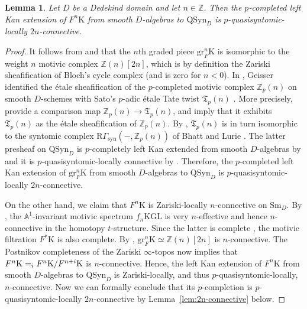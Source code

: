 \documentclass{amsart}
\numberwithin{equation}{section}
\theoremstyle{plain}
\newtheorem{lemma}[equation]{Lemma}
\theoremstyle{definition}
\let\bb=\mathbb
\def\Z{\bb Z}
\def\A{\bb A}
\def\ph{\mathord-}
\let\cat=\mathrm
\def\KGL{\mathrm{KGL}}
\def\K{\mathrm{K}{}}
\def\Sm{{\cat{S}\mathrm{m}}}
\def\gr{\mathrm{gr}}
\newcommand{\QSyn}{\mathrm{QSyn}}
\newcommand{\syn}{\mathrm{syn}}
\let\lim=\relax
\DeclareMathOperator*{\lim}{lim}
\begin{document}
\begin{lemma}\label{lem:motfil}
Let $D$ be a Dedekind domain and let $n\in\Z$.
Then the $p$-completed left Kan extension of $F^n\K$ from smooth $D$-algebras to $\QSyn_D$ is $p$-quasisyntomic-locally $2n$-connective.
\end{lemma}

\begin{proof}
It follows from \cite[Example 1.3]{Bac22} and \cite[Theorem 7.18 and Corollary 5.22]{SpitzweckHZ} that the $n$th graded piece $\gr_F^n\K$ is isomorphic to the weight $n$ motivic complex $\Z(n)[2n]$, which is by definition the Zariski sheafification of Bloch's cycle complex (and is zero for $n<0$).
In \cite{Gei}, Geisser identified the étale sheafification of the $p$-completed motivic complex $\Z_p(n)$ on smooth $D$-schemes with Sato's $p$-adic étale Tate twist $\mathfrak T_p(n)$ \cite[(1.3.3)]{SatoTwists}. More precisely, \cite[Corollary 4.4 and Theorem 1.3]{Gei} provide a comparison map $\Z_p(n)\to\mathfrak T_p(n)$, and \cite[Theorem 1.2(4) and Theorem 1.3]{Gei} imply that it exhibits $\mathfrak T_p(n)$ as the étale sheafification of $\Z_p(n)$.
By \cite[Theorem~5.8]{BM}, $\mathfrak T_p(n)$ is in turn isomorphic to the syntomic complex $\mathrm{R}\Gamma_\syn(\ph,\Z_p(n))$ of Bhatt and Lurie \cite[Section~8.4]{BhattLurie}.
The latter presheaf on $\QSyn_D$ is $p$-completely left Kan extended from smooth $D$-algebras by \cite[Proposition~8.4.10]{BhattLurie} and it is $p$-quasisyntomic-locally connective by \cite[Theorem~14.1]{BS:2022}.
Therefore, the $p$-completed left Kan extension of $\gr_F^n\K$ from smooth $D$-algebras to $\QSyn_D$ is $p$-quasisyntomic-locally $2n$-connective.

On the other hand, we claim that $F^n\K$ is Zariski-locally $n$-connective on $\Sm_D$. By \cite[Theorem 1.1(1)]{Bac22}, the $\A^1$-invariant motivic spectrum $f_n\KGL$ is very $n$-effective and hence $n$-connective in the homotopy $t$-structure. Since the latter is complete \cite[Corollary 3.8]{SchmidtStrunk}, the motivic filtration $F^*\K$ is also complete. By \cite[Corollary 4.4]{Gei}, $\gr_F^n\K\simeq \Z(n)[2n]$ is $n$-connective. The Postnikov completeness of the Zariski $\infty$-topos now implies that $F^n\K=\lim_i F^n\K/F^{n+i}\K$ is $n$-connective.
Hence, the left Kan extension of $F^n\K$ from smooth $D$-algebras to $\QSyn_D$ is Zariski-locally, and thus $p$-quasisyntomic-locally, $n$-connective.
Now we can formally conclude that its $p$-completion is $p$-quasisyntomic-locally $2n$-connective by Lemma~\ref{lem:2n-connective} below.
\end{proof}
\end{document}
